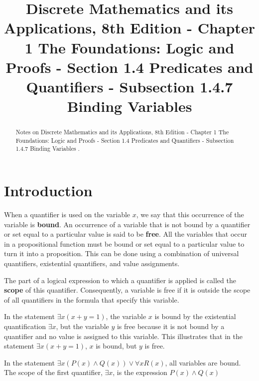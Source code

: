 \documentclass{Axon}
\title{Discrete Mathematics and its Applications, 8th Edition - Chapter 1 The Foundations: Logic and Proofs - Section 1.4 Predicates and Quantifiers - Subsection 1.4.7 Binding Variables}
\begin{document}
\maketitle
\makeauthor
\begin{abstract}
Notes on Discrete Mathematics and its Applications, 8th Edition - Chapter 1 The Foundations: Logic and Proofs - Section 1.4 Predicates and Quantifiers - Subsection 1.4.7 Binding Variables \cite{Rosen}.
\end{abstract}
\section{Introduction}
When a quantifier is used on the variable \(x\), we say that this occurrence of the variable is \textbf{bound}. An occurrence of a variable that is not bound by a quantifier or set equal to a particular value is said to be \textbf{free}. All the variables that occur in a propositional function must be bound or set equal to a particular value to turn it into a proposition. This can be done using a combination of universal quantifiers, existential quantifiers, and value assignments.

The part of a logical expression to which a quantifier is applied is called the \textbf{scope} of this quantifier. Consequently, a variable is free if it is outside the scope of all quantifiers in the formula that specify this variable.

\begin{example}
    In the statement \(\exists x (x + y = 1)\), the variable \(x\) is bound by the existential quantification \(\exists x\), but the variable \(y\) is free because it is not bound by a quantifier and no value is assigned to this variable. This illustrates that in the statement \(\exists x (x + y = 1)\), \(x\) is bound, but \(y\) is free.

    In the statement \(\exists x (P(x) \land Q(x)) \lor \forall x R(x)\), all variables are bound. The scope of the first quantifier, \(\exists x\), is the expression \(P(x) \land Q(x)\)
\end{example}

\printbibliography
\end{document}
